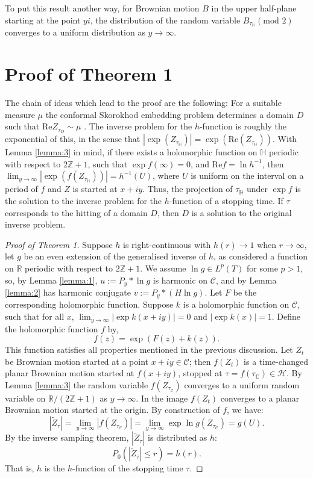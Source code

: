 \documentclass[a4paper, oneside, 12pt]{amsart}
\renewcommand{\Re}{\text{Re}}
\newcommand{\mc}{\mathcal}
\newcommand{\C}{\mathbb{C}}
\newcommand{\Z}{\mathbb{Z}}
\renewcommand{\H}{\mathbb{H}}
\newcommand{\R}{\mathbb{R}}
\newcommand{\HH}{\mathbb{H}}
\begin{document}
To put this result another way, for Brownian motion $B$ in the upper half-plane
starting at the point $yi$, the distribution of the random variable
$B_{\tau_{\HH}} (\mbox{mod } 2)$ converges to a uniform distribution as $y \to
\infty$.

\section{Proof of Theorem 1}\label{sec3}
The chain of ideas which lead to the proof are the following: For a suitable measure $\mu$ the conformal Skorokhod embedding problem
determines a domain $D$ such that $\Re Z_{\tau_D} \sim \mu$ \cite{Gross}. The inverse problem for the $h$-function is roughly the 
exponential of this, in the sense that $|\exp( Z_{\tau_\H})|=\exp(\Re(Z_{\tau_\H}))$. With Lemma \ref{lemma:3} in mind, if there exists a 
holomorphic function on $\H$ periodic with respect to $2\Z+1$, such that $\exp f(\infty) = 0$, and $\Re f = \ln h^{-1}$, then 
$\lim_{y\to\infty}|\exp(f(Z_{\tau_\H}))| = h^{-1}(U)$, where $U$ is uniform on the interval on a period of $f$ and $Z$ is started at $x+iy$. 
Thus, the projection of $\tau_\H$ under $\exp f$ is
the solution to the inverse problem for the $h$-function of a  stopping time. 
If $\tau$ corresponds to the hitting of a domain $D$, then $D$ is a solution to the original inverse problem.
\begin{proof}[Proof of Theorem 1]
	Suppose $h$ is right-continuous with $h(r)\to1$ when $r\to\infty$, let $g$ be an even extension of the generalised inverse of $h$, as 
	considered a function on $\R$ periodic with respect to $2\Z + 1$. We assume $\ln g \in L^p(T)$ for some $p>1$, so, by Lemma \ref{lemma:1},
	$u := P_y \ast \ln g$ is harmonic on $\mc{C}$, and by Lemma \ref{lemma:2} has harmonic conjugate $v:= P_y \ast (H \ln  g)$. Let $F$ be
	the corresponding holomorphic function. Suppose $k$ is a holomorphic function on $\mc{C}$, such that for all $x$, 
	$\lim_{y\to\infty}|\exp k(x+iy)| = 0$ and $|\exp k(x)| = 1$. Define the holomorphic function $f$ by,
	$$
		f(z) = \exp (F(z) + k(z)).
	$$
	This function satisfies all properties mentioned in the previous discussion. Let $Z_t$ be Brownian motion started at a point 
	$x+iy\in\mc{C}$; then $f(Z_t)$ is a time-changed planar Brownian motion started at $f(x+iy)$, stopped at $\tau= f(\tau_\C)\in\mc{H}$. 
	By Lemma \ref{lemma:3} the random variable $f(Z_{\tau_\mc{C}})$ converges to a uniform random variable on $\R/(2\Z+1)$ as $y\to\infty$.
	In the image $f(Z_t)$ converges to a planar Brownian motion started at the origin. By construction of $f$, we have:
	$$
		|\tilde Z_\tau| = \lim_{y\to\infty} |f(Z_{\tau_\mc{C}})| = \lim_{y\to\infty} \exp \ln g(Z_{\tau_{\mc{C}}}) = g(U).
	$$
	By the inverse sampling theorem, $| \tilde Z_\tau |$ is distributed as $h$: 
	$$
		P_0(|\tilde Z_\tau| \leq r) = h(r).
	$$
	That is, $h$ is the $h$-function of the stopping time $\tau$.
\end{proof}
\end{document}
